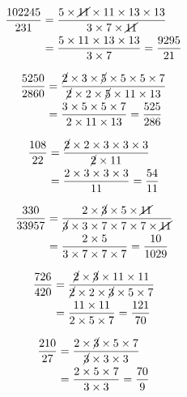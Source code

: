 {{\item\begin{align*}
    \dfrac{102245}{231} &=
    \dfrac{5 \times \cancel{11} \times 11 \times 13 \times 13}
    {3 \times 7 \times \cancel{11}}\\ &=
    \dfrac{5 \times 11 \times 13 \times 13}
    {3 \times 7} =
    \dfrac{9295}{21}
    \end{align*}

\item\begin{align*}
    \dfrac{5250}{2860} &=
    \dfrac{\cancel{2} \times 3 \times \cancel{5} \times 5 \times 5 \times 7}
    {\cancel{2} \times 2 \times \cancel{5} \times 11 \times 13}\\ &=
    \dfrac{3 \times 5 \times 5 \times 7}
    {2 \times 11 \times 13} =
    \dfrac{525}{286}
    \end{align*}

\item\begin{align*}
    \dfrac{108}{22} &=
    \dfrac{\cancel{2} \times 2 \times 3 \times 3 \times 3}
    {\cancel{2} \times 11}\\ &=
    \dfrac{2 \times 3 \times 3 \times 3}
    {11} =
    \dfrac{54}{11}
    \end{align*}

\item\begin{align*}
    \dfrac{330}{33957} &=
    \dfrac{2 \times \cancel{3} \times 5 \times \cancel{11}}
    {\cancel{3} \times 3 \times 7 \times 7 \times 7 \times \cancel{11}}\\ &=
    \dfrac{2 \times 5}
    {3 \times 7 \times 7 \times 7} =
    \dfrac{10}{1029}
    \end{align*}

\item\begin{align*}
    \dfrac{726}{420} &=
    \dfrac{\cancel{2} \times \cancel{3} \times 11 \times 11}
    {\cancel{2} \times 2 \times \cancel{3} \times 5 \times 7}\\ &=
    \dfrac{11 \times 11}
    {2 \times 5 \times 7} =
    \dfrac{121}{70}
    \end{align*}

\item\begin{align*}
    \dfrac{210}{27} &=
    \dfrac{2 \times \cancel{3} \times 5 \times 7}
    {\cancel{3} \times 3 \times 3}\\ &=
    \dfrac{2 \times 5 \times 7}
    {3 \times 3} =
    \dfrac{70}{9}
    \end{align*}

}}
